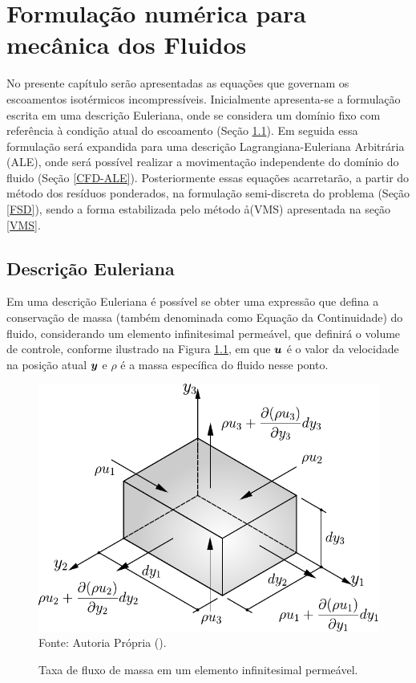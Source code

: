 \chapter{Formulação numérica para mecânica dos Fluidos} \label{EGDF}

No presente capítulo serão apresentadas as equações que governam os escoamentos isotérmicos incompressíveis. Inicialmente apresenta-se a formulação escrita em uma descrição Euleriana, onde se considera um domínio fixo com referência à condição atual do escoamento (Seção \ref{CFD-E}). Em seguida essa formulação será expandida para uma descrição Lagrangiana-Euleriana Arbitrária (ALE), onde será possível realizar a movimentação independente do domínio do fluido (Seção \ref{CFD-ALE}). Posteriormente essas equações acarretarão, a partir do método dos resíduos ponderados, na formulação semi-discreta do problema (Seção \ref{FSD}), sendo a forma estabilizada pelo método \VMS\aa (VMS) apresentada na seção \ref{VMS}.

\section{Descrição Euleriana} \label{CFD-E}

Em uma descrição Euleriana é possível se obter uma expressão que defina a conservação de massa (também denominada como Equação da Continuidade) do fluido, considerando um elemento infinitesimal permeável, que definirá o volume de controle, conforme ilustrado na Figura \ref{fig:BalMas}, em que $\boldsymbol{u}$ é o valor da velocidade na posição atual $\boldsymbol{y}$ e $\rho$ é a massa específica do fluido nesse ponto.

\begin{figure}[h!]
    \centering
    \caption{Taxa de fluxo de massa em um elemento infinitesimal permeável.}
    \includegraphics[width=.5\linewidth]{Figuras/BalMas.pdf}
    \\Fonte: Autoria Própria (\the\year).
    \label{fig:BalMas}
\end{figure}

